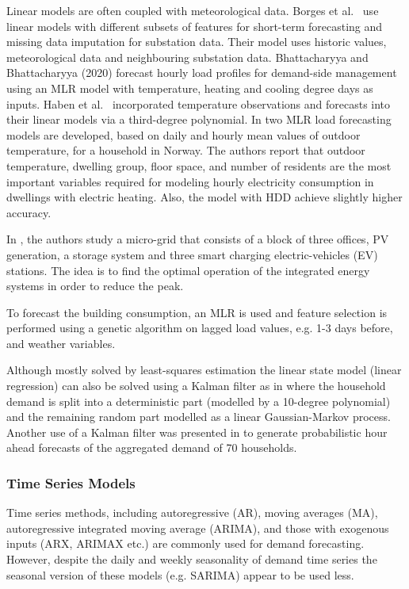 Linear models are often coupled with meteorological data. Borges et al.~\cite{borges2020etm} use linear models with different subsets of features for short-term forecasting and missing data imputation for substation data. Their model uses historic values, meteorological data and neighbouring substation data. Bhattacharyya and Bhattacharyya (2020) \cite{Bhattacharyya2020sgd} forecast hourly load profiles for demand-side management using an MLR model with temperature, heating and cooling degree days as inputs. 
Haben et al.~\cite{Haben2019stl} incorporated temperature observations and forecasts into their linear models via a third-degree polynomial. In \cite{kipping2016mad} two MLR load forecasting models are developed, based on daily and hourly mean values of outdoor temperature, for a household in Norway. 
The authors report that outdoor temperature, dwelling group, floor space, and number of residents are the most important variables required for modeling hourly electricity consumption in dwellings with electric heating. Also, the model with HDD achieve slightly higher accuracy. 

In \cite{vincenzo2020cml}, the authors study a micro-grid that consists of a block of three offices, PV generation, a storage system and three smart charging electric-vehicles (EV) stations. The idea is to find the optimal operation of the integrated energy systems in order to reduce the peak. 

To forecast the building consumption, an MLR is used and feature selection is performed using a genetic algorithm 
on lagged load values, e.g. 1-3 days before, and weather variables.

Although mostly solved by least-squares estimation the linear state model (linear regression) can also be solved using a Kalman filter as in \cite{Ghofrani2011smb} where the household demand is split into a deterministic part (modelled by a 10-degree polynomial) and the remaining random part modelled as a linear Gaussian-Markov process. Another use of a Kalman filter was presented in  \cite{perfumo2014mbe} to generate probabilistic hour ahead forecasts of the aggregated demand of 70 households. 




\subsubsection{Time Series Models}
\label{sec:tsmodel}
Time series methods, including autoregressive (AR), moving averages (MA), autoregressive integrated moving average (ARIMA), and those with exogenous inputs (ARX, ARIMAX etc.) are commonly used for demand forecasting. However, despite the daily and weekly seasonality of demand time series the seasonal version of these models (e.g. SARIMA) appear to be used less.

